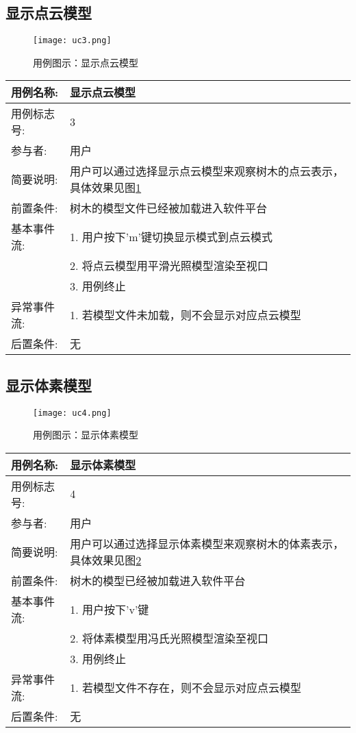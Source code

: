 \clearpage
\subsection{显示点云模型}
\begin{figure}[H]
	\centering
	\texttt{[image: uc3.png]}
	\caption{用例图示：显示点云模型}
	\label{fig:uc3}
\end{figure}

\begin{table}[H]
	\centering
\begin{tabular}{|l|p{8cm}|}
	\hline
	用例名称: & 显示点云模型\\
	\hline
	用例标志号: & 3\\
	\hline
	参与者: & 用户\\
	\hline
	简要说明: & 用户可以通过选择显示点云模型来观察树木的点云表示，具体效果见图\ref{fig:uc3}\\
	\hline
	前置条件: & 树木的模型文件已经被加载进入软件平台\\
	\hline
	基本事件流: & 1. 用户按下'm'键切换显示模式到点云模式\\
	 & 2. 将点云模型用平滑光照模型渲染至视口\\
	 & 3. 用例终止\\
	\hline
	异常事件流: & 1. 若模型文件未加载，则不会显示对应点云模型\\
	\hline
	后置条件: & 无\\
	\hline
\end{tabular}
\end{table}

\clearpage
\subsection{显示体素模型}
\begin{figure}[H]
	\centering
	\texttt{[image: uc4.png]}
	\caption{用例图示：显示体素模型}
	\label{fig:uc4}
\end{figure}

\begin{table}[H]
	\centering
\begin{tabular}{|l|p{8cm}|}
	\hline
	用例名称: & 显示体素模型\\
	\hline
	用例标志号: & 4\\
	\hline
	参与者: & 用户\\
	\hline
	简要说明: & 用户可以通过选择显示体素模型来观察树木的体素表示，具体效果见图\ref{fig:uc4}\\
	\hline
	前置条件: & 树木的模型已经被加载进入软件平台\\
	\hline
	基本事件流: & 1. 用户按下'v'键\\
	 & 2. 将体素模型用冯氏光照模型渲染至视口\\
	 & 3. 用例终止\\
	\hline
	异常事件流: & 1. 若模型文件不存在，则不会显示对应点云模型\\
	\hline
	后置条件: & 无\\
	\hline
\end{tabular}
\end{table}


